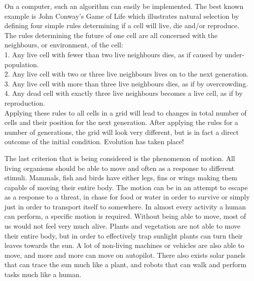 On a computer, such an algorithm can easily be implemented. The best known example is John Conway's Game of Life \cite{Conway} which illustrates natural selection by defining four simple rules determining if a cell will live, die and/or reproduce. The rules determining the future of one cell are all concerned with the neighbours, or environment, of the cell: \\
1. Any live cell with fewer than two live neighbours dies, as if caused by under-population. \\
2. Any live cell with two or three live neighbours lives on to the next generation. \\
3. Any live cell with more than three live neighbours dies, as if by overcrowding. \\
4. Any dead cell with exactly three live neighbours becomes a live cell, as if by reproduction. \\
Applying these rules to all cells in a grid will lead to changes in total number of cells and their position for the next generation. After applying the rules for a number of generations, the grid will look very different, but is in fact a direct outcome of the initial condition. Evolution has taken place!

The last criterion that is being considered is the phenomenon of motion. All living organisms should be able to move and often as a response to different stimuli. Mammals, fish and birds have either legs, fins or wings making them capable of moving their entire body. The motion can be in an attempt to escape as a response to a threat, in chase for food or water in order to survive or simply just in order to transport itself to somewhere. In almost every activity a human can perform, a specific motion is required. Without being able to move, most of us would not feel very much alive. Plants and vegetation are not able to move their entire body, but in order to effectively trap sunlight plants can turn their leaves towards the sun. A lot of non-living machines or vehicles are also able to move, and more and more can move on autopilot. There also exists solar panels that can trace the sun much like a plant, and robots that can walk and perform tasks much like a human. 
 































